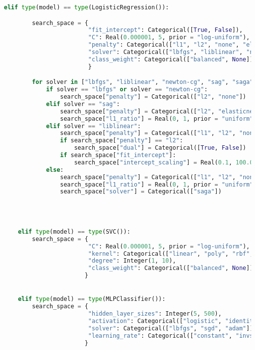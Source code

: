 \begin{lstlisting}[language=Python, basicstyle=\footnotesize\ttfamily]
    elif type(model) == type(LogisticRegression()):

        search_space = {
                        "fit_intercept": Categorical([True, False]),
                        "C": Real(0.000001, 5, prior = "log-uniform"),
                        "penalty": Categorical(["l1", "l2", "none", "elasticnet"]),
                        "solver": Categorical(["lbfgs", "liblinear", "newton-cg", "sag", "saga"]),
                        "class_weight": Categorical(["balanced", None])
                        }

        for solver in ["lbfgs", "liblinear", "newton-cg", "sag", "saga"]:
            if solver == "lbfgs" or solver == "newton-cg":
                search_space["penalty"] = Categorical(["l2", "none"])
            elif solver == "sag":
                search_space["penalty"] = Categorical(["l2", "elasticnet"])
                search_space["l1_ratio"] = Real(0, 1, prior = "uniform")
            elif solver == "liblinear":
                search_space["penalty"] = Categorical(["l1", "l2", "none", "elasticnet"])
                if search_space["penalty"] == "l2":
                    search_space["dual"] = Categorical([True, False])
                if search_space["fit_intercept"]:
                    search_space["intercept_scaling"] = Real(0.1, 100.0, prior="log-uniform")
            else:
                search_space["penalty"] = Categorical(["l1", "l2", "none", "elasticnet"])
                search_space["l1_ratio"] = Real(0, 1, prior = "uniform")
                search_space["solver"] = Categorical(["saga"])




    elif type(model) == type(SVC()):
        search_space = {
                        "C": Real(0.000001, 5, prior = "log-uniform"),
                        "kernel": Categorical(["linear", "poly", "rbf", "sigmoid"]),
                        "degree": Integer(1, 10),
                        "class_weight": Categorical(["balanced", None])
                       }


    elif type(model) == type(MLPClassifier()):
        search_space = {
                        "hidden_layer_sizes": Integer(5, 500),
                        "activation": Categorical(["logistic", "identity", "tanh", "relu"]),
                        "solver": Categorical(["lbfgs", "sgd", "adam"]),
                        "learning_rate": Categorical(["constant", "invscaling", "adaptive"]),
                       }
        



\end{lstlisting}

